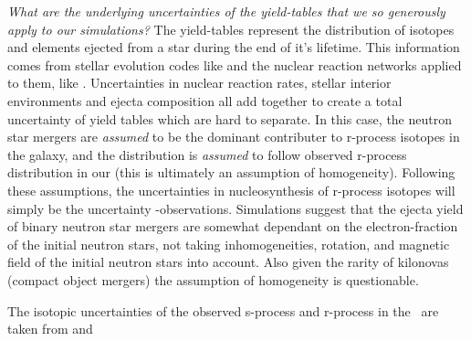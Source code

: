 \textit{What are the underlying uncertainties of the yield-tables that we so generously apply to our simulations?}
The yield-tables represent the distribution of isotopes and elements ejected from a star during the end of it's lifetime. This information comes from stellar evolution codes like \cite{paxton11} and the nuclear reaction networks applied to them, like \cite{pignatari16}.
Uncertainties in nuclear reaction rates, stellar interior environments and ejecta composition all add together to create a total uncertainty of yield tables which are hard to separate.
In this case, the neutron star mergers are \textit{assumed} to be the dominant contributer to r-process isotopes in the galaxy, and the distribution is \textit{assumed} to follow observed r-process distribution in our \sos (this is ultimately an assumption of homogeneity).
Following these assumptions, the uncertainties in nucleosynthesis of r-process isotopes will simply be the uncertainty \sos-observations\cite{arnould07}.
Simulations suggest that the ejecta yield of binary neutron star mergers are somewhat dependant on the electron-fraction of the initial neutron stars, not taking inhomogeneities, rotation, and magnetic field of the initial neutron stars into account. Also given the rarity of kilonovas (compact object mergers) the assumption of homogeneity is questionable.



The isotopic uncertainties of the observed s-process and r-process in the \sos\ are taken from \cite{arnould07} and \cite{landolt93}



